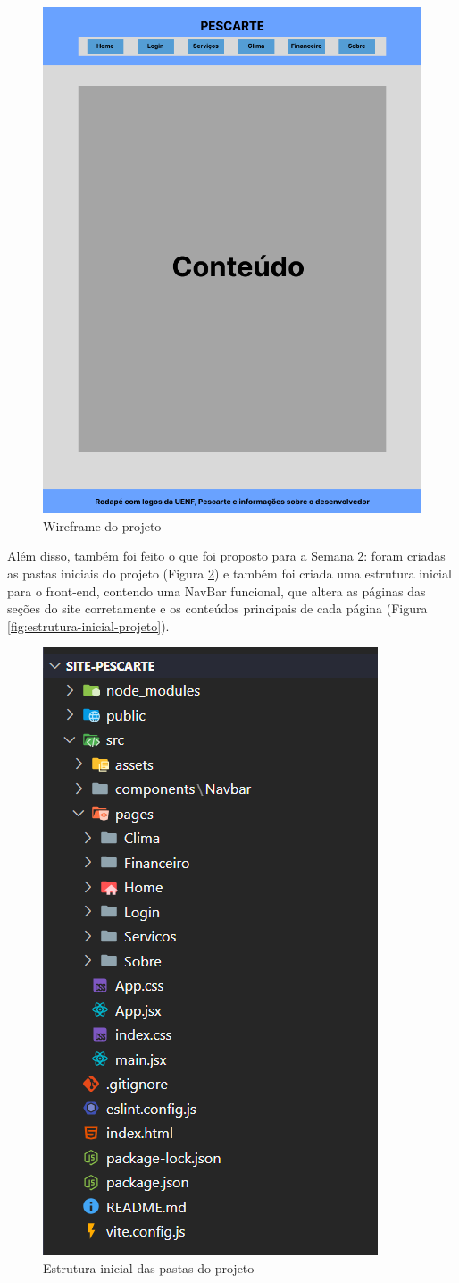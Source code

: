 \documentclass[a4paper]{abntex2}
\begin{document}
\begin{figure}[H]
    \centering
    \includegraphics[width=0.75\linewidth]{imagens/Wireframe-projeto.png}
    \caption{Wireframe do projeto}
    \label{fig:wireframe-projeto}
\end{figure}

Além disso, também foi feito o que foi proposto para a Semana 2: foram criadas as pastas iniciais do projeto (Figura \ref{fig:esqueleto-front-end}) e também foi criada uma estrutura inicial para o front-end, contendo uma NavBar funcional, que altera as páginas das seções do site corretamente e os conteúdos principais de cada página (Figura \ref{fig:estrutura-inicial-projeto}).

\begin{figure}[H]
    \centering
    \includegraphics[width=0.25\linewidth]{imagens/esqueleto-front-end.png}
    \caption{Estrutura inicial das pastas do projeto}
    \label{fig:esqueleto-front-end}
\end{figure}
\end{document}

